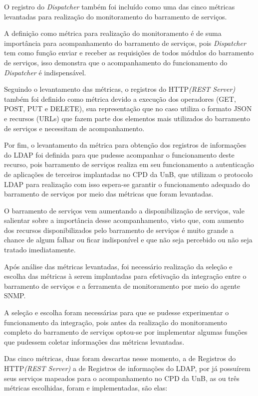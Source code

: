 O registro do \textit{Dispatcher} também foi incluído como uma das cinco métricas levantadas para realização do monitoramento do barramento de serviços. 

A definição como métrica para realização do monitoramento é de suma importância para acompanhamento do barramento de serviços, pois \textit{Dispatcher} tem como função enviar e receber as requisições de todos módulos do barramento de serviços, isso demonstra que o acompanhamento do funcionamento do \textit{Dispatcher} é indispensável. 

Seguindo o levantamento das métricas, o registros do HTTP\textit{(REST Server)} também foi definido como métrica devido a execução dos operadores (GET, POST, PUT e DELETE), sua representação que no caso utiliza o formato \acrshort{JSON} e recursos (URLs) que fazem parte dos elementos mais utilizados do barramento de serviços e necessitam de acompanhamento.

Por fim, o levantamento da métrica para obtenção dos registros de informações do LDAP foi definida para que pudesse acompanhar o funcionamento deste recurso, pois barramento de serviços realiza em seu funcionamento a autenticação de aplicações de terceiros implantadas no CPD da UnB, que utilizam o protocolo LDAP para realização com isso espera-se garantir o funcionamento adequado do barramento de serviços por meio das métricas que foram levantadas. 

O barramento de serviços vem aumentando a disponibilização de serviços, vale salientar sobre a importância desse acompanhamento, visto que, com aumento dos recursos disponibilizados pelo barramento de serviços é muito grande a chance de algum falhar ou ficar indisponível e que não seja percebido ou não seja tratado imediatamente.  

Após análise das métricas levantadas, foi necessário realização da seleção e escolha das métricas à serem implantadas para efetivação da integração entre o barramento de serviços e a ferramenta de monitoramento por meio do agente \acrshort{SNMP}. 

A seleção e escolha foram necessárias para que se pudesse experimentar o funcionamento da integração, pois antes da realização do monitoramento completo do barramento de serviços optou-se por implementar algumas funções que pudessem coletar informações das métricas levantadas. 

Das cinco métricas, duas foram descartas nesse momento, a de Registros do HTTP\textit{(REST Server)} a de Registros de informações do LDAP, por já possuírem seus serviços mapeados para o acompanhamento no \acrshort{CPD} da \acrshort{UnB}, as ou três métricas escolhidas, foram e implementadas, são elas: 

